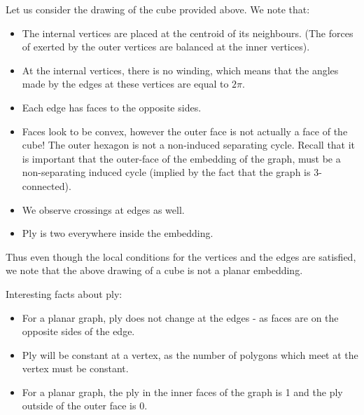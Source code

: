 \documentclass{article}
\begin{document}
    \medskip \noindent Let us consider the drawing of the cube provided above. We note that:
    \begin{itemize}
        \item The internal vertices are placed at the centroid of its neighbours. (The forces of exerted by the outer vertices are balanced at the inner vertices). 
        \item At the internal vertices, there is no winding, which means that the angles made by the edges at these vertices are equal to $2 \pi$.
        \item Each edge has faces to the opposite sides. 
        \item Faces look to be convex, however the outer face is not actually a face of the cube! The outer hexagon is not a non-induced separating cycle. Recall that it is important that the outer-face of the embedding of the graph, must be a non-separating induced cycle (implied by the fact that the graph is 3-connected). 
        \item We observe crossings at edges as well. 
        \item Ply is two everywhere inside the embedding. 
    \end{itemize}
    Thus even though the local conditions for the vertices and the edges are satisfied, we note that the above drawing of a cube is not a planar embedding.
     
    \medskip \noindent Interesting facts about ply:
    \begin{itemize}
        \item For a planar graph, ply does not change at the edges - as faces are on the opposite sides of the edge.
        \item Ply will be constant at a vertex, as the number of polygons which meet at the vertex must be constant.
        \item For a planar graph, the ply in the inner faces of the graph is 1 and the ply outside of the outer face is 0.
    \end{itemize}
    
\end{document}
